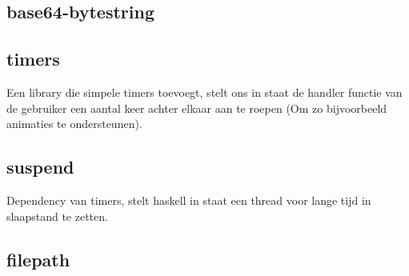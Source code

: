 \subsection{base64-bytestring}
\subsection{timers}
Een library die simpele timers toevoegt, stelt ons in staat de handler functie van de gebruiker een aantal keer achter elkaar aan te roepen (Om zo bijvoorbeeld animaties te ondersteunen).  
\subsection{suspend}
Dependency van timers, stelt haskell in staat een thread voor lange tijd in slaapstand te zetten.
\subsection{filepath}
